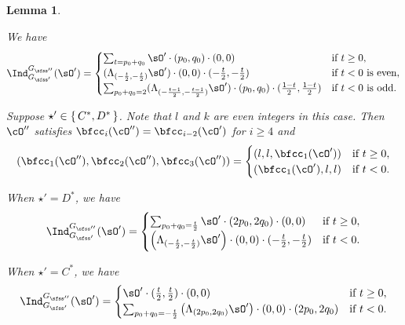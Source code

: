 \documentclass[12pt,a4paper]{amsart}
\numberwithin{equation}{section}
\newtheorem{lem}[thm]{Lemma}
\theoremstyle{remark}
\def\cOp{\cO^{\prime}}
\def\cOpp{\cO^{\prime\prime}}
\begin{document}
\begin{lem}
\begin{enuma}
    We have
    \[
      \indsss(\sOp) =
      \begin{cases}
        \sum_{t=p_0+q_0}\sOp\cdot (p_0,q_0)\cdot (0,0)
           & \text{if $t\geq 0$}, \\
        (\Lambda_{(-\frac{t}{2},-\frac{t}{2})}\sOp) \cdot (0,0)
        \cdot (-\frac{t}{2},-\frac{t}{2})
         & \text{if $t < 0$ is even},  \\
        \sum_{p_0+q_0 = 2}(\Lambda_{(-\frac{t-1}{2},-\frac{t-1}{2})}\sOp) 
        \cdot (p_0,q_0) \cdot (\frac{1-t}{2},\frac{1-t}{2})
            & \text{if $t<0$ is odd}.             \\
      \end{cases}
    \]
    \item Suppose $\star' \in \set{C^*,D^*}$. 
    Note that  $l$ and $k$ are even integers in this case.  
    Then $\cOpp$ satisfies 
    $\bfcc_i(\cOpp)=\bfcc_{i-2}(\cOp)$ for $i\geq 4$ and
    \[
      (\bfcc_1(\cOpp), \bfcc_2(\cOpp),\bfcc_3(\cOpp))
      =\begin{cases}
        (l,l,\bfcc_1(\cOp))     & \text{if $t\geq 0$}, \\
        (\bfcc_1(\cOp),l,l)     & \text{if $t<0$}.             \\
      \end{cases}
    \]

    When $\star' = D^*$, we have
    \[
      \indsss(\sOp) =
      \begin{cases}
        \sum_{p_0+q_0 =\frac{t}{2}}
        \sOp\cdot (2p_0,2q_0)\cdot (0,0)
         & \text{if $t \geq 0$}, \\
        \left(\Lambda_{(-\frac{t}{2},-\frac{t}{2})} \sOp \right)\cdot (0,0) 
        \cdot (-\frac{t}{2},-\frac{t}{2})
         & \text{if $t < 0$}. \\
      \end{cases}
    \]

    When $\star'=C^*$, we have
    \[
      \indsss(\sOp) =
      \begin{cases}
        \sOp\cdot (\frac{t}{2},\frac{t}{2}) \cdot (0,0)
         & \text{if $t \geq 0$}, \\
         \sum_{p_0+q_0 = -\frac{t}{2}}
        \left(\Lambda_{(2p_0,2q_0)} \sOp \right)\cdot (0,0) 
        \cdot (2p_0,2q_0)
         & \text{if $t < 0$}. \\
      \end{cases}
    \]
  \end{enuma}
\end{lem}
\end{document}
